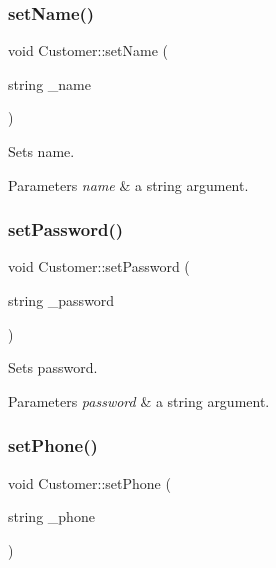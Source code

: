 \subsubsection{\texorpdfstring{set\+Name()}{setName()}}
{\footnotesize\ttfamily void Customer\+::set\+Name (\begin{DoxyParamCaption}\item[{string}]{\+\_\+name }\end{DoxyParamCaption})}



Sets name. 


\begin{DoxyParams}{Parameters}
{\em name} & a string argument. \\
\hline
\end{DoxyParams}
\mbox{\label{classCustomer_a87953a93ed8a81f9835d26d2ecf3742a}} 
\subsubsection{\texorpdfstring{set\+Password()}{setPassword()}}
{\footnotesize\ttfamily void Customer\+::set\+Password (\begin{DoxyParamCaption}\item[{string}]{\+\_\+password }\end{DoxyParamCaption})}



Sets password. 


\begin{DoxyParams}{Parameters}
{\em password} & a string argument. \\
\hline
\end{DoxyParams}
\mbox{\label{classCustomer_a84e30f04f40a6ef54ec223756b0a59bf}} 
\subsubsection{\texorpdfstring{set\+Phone()}{setPhone()}}
{\footnotesize\ttfamily void Customer\+::set\+Phone (\begin{DoxyParamCaption}\item[{string}]{\+\_\+phone }\end{DoxyParamCaption})}



